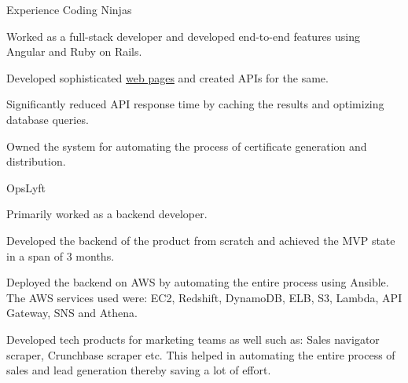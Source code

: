 \documentclass[]{resume-knyte}
\begin{document}
\begin{topic}{Experience}
    {Coding Ninjas}
    {\begin{tightitemize}
        \item Worked as a full-stack developer and developed end-to-end features using Angular and Ruby on Rails.
        \item Developed sophisticated \href{https://www.codingninjas.com/courses/premium-foundation-course}{web pages} and created APIs for the same.
        \item Significantly reduced API response time by caching the results and optimizing database queries.
        \item Owned the system for automating the process of certificate generation and distribution.
    \end{tightitemize}}
    {OpsLyft}
    {\begin{tightitemize}
        \item Primarily worked as a backend developer.
        \item Developed the backend of the product from scratch and achieved the MVP state in a span of 3 months.
        \item Deployed the backend on AWS by automating the entire process using Ansible. The AWS services used were: EC2, Redshift, DynamoDB, ELB, S3, Lambda, API Gateway, SNS and Athena.
        \item Developed tech products for marketing teams as well such as: Sales navigator scraper, Crunchbase scraper etc. This helped in automating the entire process of sales and lead generation thereby saving a lot of effort.
    \end{tightitemize}}
\end{topic}
\end{document}

